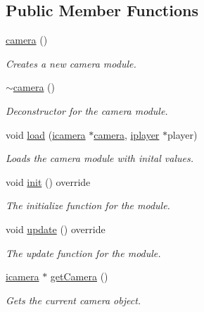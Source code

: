 \subsection*{Public Member Functions}
\begin{DoxyCompactItemize}
\item 
\hyperlink{classflounder_1_1camera_a84e93f21953c21facbcddf77d83c7c47}{camera} ()
\begin{DoxyCompactList}\small\item\em Creates a new camera module. \end{DoxyCompactList}\item 
\hyperlink{classflounder_1_1camera_ada55d236f9f9b9a301b3fd747d15d4d0}{$\sim$camera} ()
\begin{DoxyCompactList}\small\item\em Deconstructor for the camera module. \end{DoxyCompactList}\item 
void \hyperlink{classflounder_1_1camera_a430059bcefcaa3ad93b719ae64cd95ca}{load} (\hyperlink{classflounder_1_1icamera}{icamera} $\ast$\hyperlink{classflounder_1_1camera}{camera}, \hyperlink{classflounder_1_1iplayer}{iplayer} $\ast$player)
\begin{DoxyCompactList}\small\item\em Loads the camera module with inital values. \end{DoxyCompactList}\item 
void \hyperlink{classflounder_1_1camera_a3deb0358c2a67ad864a630adaf566c4e}{init} () override
\begin{DoxyCompactList}\small\item\em The initialize function for the module. \end{DoxyCompactList}\item 
void \hyperlink{classflounder_1_1camera_a6b2da3a1c348764d3cf954db5ac5b357}{update} () override
\begin{DoxyCompactList}\small\item\em The update function for the module. \end{DoxyCompactList}\item 
\hyperlink{classflounder_1_1icamera}{icamera} $\ast$ \hyperlink{classflounder_1_1camera_abc16dba0c44428f99ce65af2c1dac5b8}{get\+Camera} ()
\begin{DoxyCompactList}\small\item\em Gets the current camera object. \end{DoxyCompactList}\item 

\end{DoxyCompactItemize}
